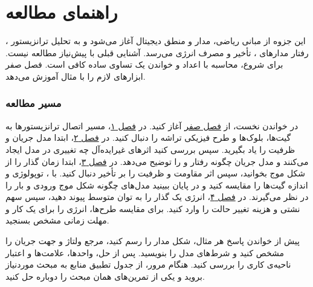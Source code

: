 \chapter*{راهنمای مطالعه}
{}

این جزوه از مبانی ریاضی، مدار و منطق دیجیتال آغاز می‌شود و به تحلیل
ترانزیستور ، رفتار مدارهای ، تأخیر و مصرف انرژی می‌رسد. آشنایی قبلی با
 پیش‌نیاز مطالعه نیست. برای شروع، محاسبه با اعداد
و خواندن یک تساوی ساده کافی است. فصل صفر ابزارهای لازم را با مثال آموزش می‌دهد.

\subsection*{مسیر مطالعه}
در خواندن نخست، از \hyperref[chap:foundations]{فصل صفر} آغاز کنید. در
\hyperref[chap:introduction]{فصل ۱}، مسیر اتصال ترانزیستورها به گیت‌ها،
بلوک‌ها و طرح فیزیکی تراشه را دنبال کنید. در \hyperref[chap:mos-theory]{فصل ۲}،
ابتدا مدل جریان و ظرفیت را یاد بگیرید. سپس بررسی کنید اثرهای غیرایده‌آل
چه تغییری در مدل ایجاد می‌کنند و مدل جریان چگونه رفتار 
و  را توضیح می‌دهد.
در \hyperref[chap:delay]{فصل ۳}، ابتدا زمان گذار را از شکل موج بخوانید،
سپس اثر مقاومت و ظرفیت را بر تأخیر دنبال کنید. با ،
توپولوژی و اندازه گیت‌ها را مقایسه کنید و در پایان ببینید
مدل‌های  چگونه شکل موج ورودی و بار را در نظر می‌گیرند.
در \hyperref[chap:power]{فصل ۴}، انرژی یک گذار را به توان متوسط
پیوند دهید، سپس سهم نشتی و هزینه تغییر حالت را وارد کنید. برای
مقایسه طرح‌ها، انرژی را برای یک کار و مهلت زمانی مشخص بسنجید.

پیش از خواندن پاسخ هر مثال، شکل مدار را رسم کنید، مرجع ولتاژ و جهت
جریان را مشخص کنید و شرط‌های مدل را بنویسید. پس از حل، واحدها، علامت‌ها
و اعتبار ناحیه‌ی کاری را بررسی کنید. هنگام مرور، از جدول تطبیق منابع
به مبحث موردنیاز بروید و یکی از تمرین‌های همان مبحث را دوباره حل کنید.

